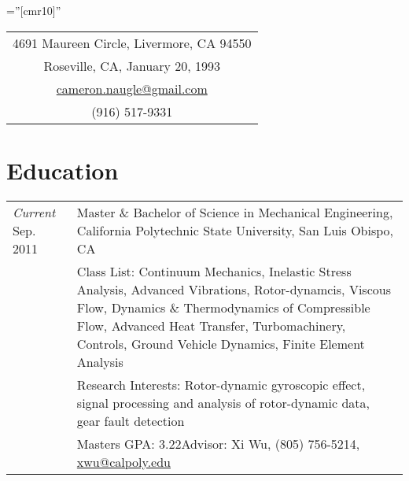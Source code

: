 \documentclass[10pt]{article} %
\newcommand{\secspace}{-.25em}
\begin{document}
\thispagestyle{empty} %

\font\fb=''[cmr10]'' %
\setlength{\linewidth}{6.5in}
\setlength{\hsize}{6.5in}

\par{\par} %


\begin{center}
	\begin{tabular} {c}
		
		4691 Maureen Circle, Livermore, CA 94550 \\
		Roseville, CA, January 20, 1993 \\
		\href{mailto:cameron.naugle@gmail.com}{cameron.naugle@gmail.com}\\
		(916) 517-9331\\[\secspace]
	\end{tabular}
\end{center}


\section{ Education}

\begin{tabular}{p{.6in}|p{5.5in}}	
	\emph{Current} Sep. 2011 & Master \& Bachelor of Science in Mechanical Engineering,  California Polytechnic State University, San Luis Obispo, CA\\
	& \footnotesize{Class List: Continuum Mechanics, Inelastic Stress Analysis, Advanced Vibrations, Rotor-dynamcis, Viscous Flow, Dynamics \& Thermodynamics of Compressible Flow, Advanced Heat Transfer, Turbomachinery, Controls, Ground Vehicle Dynamics, Finite Element Analysis}\\
	& \footnotesize{Research Interests: Rotor-dynamic gyroscopic effect, signal processing and analysis of rotor-dynamic data, gear fault detection}\\
	&\footnotesize{Masters GPA: 3.22\hfill  Advisor: Xi Wu, (805) 756-5214}, \href{mailto:xwu@calpoly.edu}{xwu@calpoly.edu}\\[\secspace]

\end{tabular}
\end{document}
